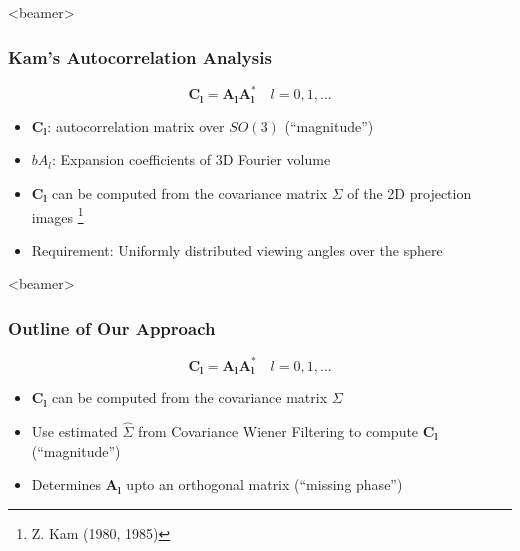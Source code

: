 \documentclass{beamer}
\newcommand\blfootnote[1]{%
  \begingroup
  \renewcommand\thefootnote{}\footnote{#1}%
  \addtocounter{footnote}{-1}%
  \endgroup
}
\newcommand{\bl}{\boldsymbol{l}}
\newcommand{\bC}{\boldsymbol{C}}
\def\bA{\boldsymbol{A}}
\def\bl{\boldsymbol{l}}
\begin{document}
\begin{frame}<beamer>
\frametitle{Kam's Autocorrelation Analysis}
\begin{equation}
\label{eq:Cl}
\bC_{{\bl}}= \bA_{\bl} \bA_{\bl}^*  \quad l=0,1,\ldots
\end{equation}

\begin{itemize}
\item $\bC_{\bl}$: autocorrelation matrix over $SO(3)$ (\alert{``magnitude''})
\item $bA_l$: Expansion coefficients of 3D Fourier volume
\item $\bC_{\bl}$ can be computed from the covariance matrix $\Sigma$ of the 2D projection images \blfootnote{Z. Kam (1980, 1985)}
\item Requirement: Uniformly distributed viewing angles over the sphere
\end{itemize}
\end{frame}


\begin{frame}<beamer>
\frametitle{Outline of Our Approach}
\begin{equation}
\label{eq:Cl}
\bC_{{\bl}}= \bA_{\bl} \bA_{\bl}^*  \quad l=0,1,\ldots
\end{equation}

\begin{itemize}

\item $\bC_{\bl}$ can be computed from the covariance matrix $\Sigma$
\item Use estimated $\hat\Sigma$ from Covariance Wiener Filtering to compute $\bC_{\bl}$ (\alert{``magnitude''})
\item Determines $\bA_{\bl}$ upto an orthogonal matrix (\alert{``missing phase''})
\end{itemize}
\end{frame}

\end{document}
